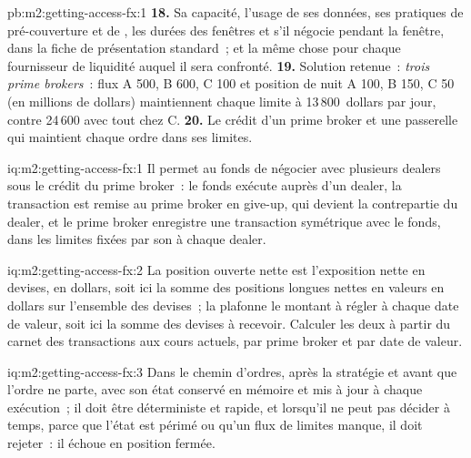 \begin{solution}{pb:m2:getting-access-fx:1}
\textbf{18.} Sa capacité, l'usage de ses données, ses pratiques de pré-couverture et de , les durées des fenêtres
et s'il négocie pendant la fenêtre, dans la fiche de présentation standard~; et la même chose pour chaque
fournisseur de liquidité auquel il sera confronté.
\textbf{19.} Solution retenue~: \emph{trois prime brokers}~: flux A 500, B 600, C 100 et
position de nuit A 100, B 150, C 50 (en millions de dollars) maintiennent chaque limite à 13\,800~dollars par
jour, contre 24\,600 avec tout chez C.
\textbf{20.} Le crédit d'un prime broker et une passerelle qui maintient chaque ordre dans ses limites.
\end{solution}

\begin{solution}{iq:m2:getting-access-fx:1}
Il permet au fonds de négocier avec plusieurs dealers sous le crédit du prime broker~: le fonds
exécute auprès d'un dealer, la transaction est remise au prime broker en give-up, qui devient la
contrepartie du dealer, et le prime broker enregistre une transaction symétrique avec le fonds,
dans les limites fixées par son  à chaque dealer.
\end{solution}

\begin{solution}{iq:m2:getting-access-fx:2}
La position ouverte nette est l'exposition nette en devises, en dollars, soit ici la somme des positions longues nettes en
valeurs en dollars sur l'ensemble des devises~; la  plafonne le montant à régler à
chaque date de valeur, soit ici la somme des devises à recevoir. Calculer les deux à partir du
carnet des transactions aux cours actuels, par prime broker et par date de valeur.
\end{solution}

\begin{solution}{iq:m2:getting-access-fx:3}
Dans le chemin d'ordres, après la stratégie et avant que l'ordre ne parte, avec son état conservé
en mémoire et mis à jour à chaque exécution~; il doit être déterministe et rapide, et lorsqu'il
ne peut pas décider à temps, parce que l'état est périmé ou qu'un flux de limites manque, il doit
rejeter~: il échoue en position fermée.
\end{solution}

